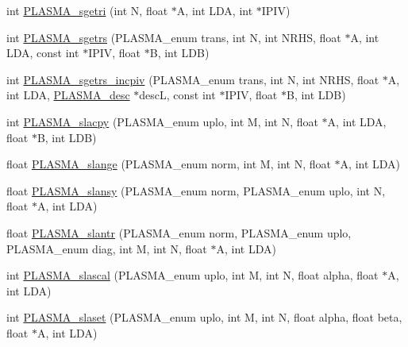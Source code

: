 \begin{DoxyCompactItemize}
int \hyperlink{group__float_gadb78715cdd99791aa77c2640f1325f8e_gadb78715cdd99791aa77c2640f1325f8e}{P\+L\+A\+S\+M\+A\+\_\+sgetri} (int N, float $\ast$A, int L\+D\+A, int $\ast$I\+P\+I\+V)
\item 
int \hyperlink{group__float_ga655cb742ac1c78e5ce86070f4ce1271b_ga655cb742ac1c78e5ce86070f4ce1271b}{P\+L\+A\+S\+M\+A\+\_\+sgetrs} (P\+L\+A\+S\+M\+A\+\_\+enum trans, int N, int N\+R\+H\+S, float $\ast$A, int L\+D\+A, const int $\ast$I\+P\+I\+V, float $\ast$B, int L\+D\+B)
\item 
int \hyperlink{group__float_gae593ed2d7e164acc75c4e6efdca4d95a_gae593ed2d7e164acc75c4e6efdca4d95a}{P\+L\+A\+S\+M\+A\+\_\+sgetrs\+\_\+incpiv} (P\+L\+A\+S\+M\+A\+\_\+enum trans, int N, int N\+R\+H\+S, float $\ast$A, int L\+D\+A, \hyperlink{structplasma__desc__t}{P\+L\+A\+S\+M\+A\+\_\+desc} $\ast$desc\+L, const int $\ast$I\+P\+I\+V, float $\ast$B, int L\+D\+B)
\item 
int \hyperlink{group__float_ga2ae5e8cc7cf6222bf521a6decd6c27a1_ga2ae5e8cc7cf6222bf521a6decd6c27a1}{P\+L\+A\+S\+M\+A\+\_\+slacpy} (P\+L\+A\+S\+M\+A\+\_\+enum uplo, int M, int N, float $\ast$A, int L\+D\+A, float $\ast$B, int L\+D\+B)
\item 
float \hyperlink{group__float_gaf12ff85306bc548593674ce694d5e5be_gaf12ff85306bc548593674ce694d5e5be}{P\+L\+A\+S\+M\+A\+\_\+slange} (P\+L\+A\+S\+M\+A\+\_\+enum norm, int M, int N, float $\ast$A, int L\+D\+A)
\item 
float \hyperlink{group__float_gaad7d8cac5c5334f8cc144f36050bbdc3_gaad7d8cac5c5334f8cc144f36050bbdc3}{P\+L\+A\+S\+M\+A\+\_\+slansy} (P\+L\+A\+S\+M\+A\+\_\+enum norm, P\+L\+A\+S\+M\+A\+\_\+enum uplo, int N, float $\ast$A, int L\+D\+A)
\item 
float \hyperlink{group__float_gac89a3f7eb1600d358791d38d2e662cb1_gac89a3f7eb1600d358791d38d2e662cb1}{P\+L\+A\+S\+M\+A\+\_\+slantr} (P\+L\+A\+S\+M\+A\+\_\+enum norm, P\+L\+A\+S\+M\+A\+\_\+enum uplo, P\+L\+A\+S\+M\+A\+\_\+enum diag, int M, int N, float $\ast$A, int L\+D\+A)
\item 
int \hyperlink{group__float_ga70bbb11d008076ce34d89399a31d5ca2_ga70bbb11d008076ce34d89399a31d5ca2}{P\+L\+A\+S\+M\+A\+\_\+slascal} (P\+L\+A\+S\+M\+A\+\_\+enum uplo, int M, int N, float alpha, float $\ast$A, int L\+D\+A)
\item 
int \hyperlink{group__float_gaeb7486c1cb46dd4a81c11981605c093c_gaeb7486c1cb46dd4a81c11981605c093c}{P\+L\+A\+S\+M\+A\+\_\+slaset} (P\+L\+A\+S\+M\+A\+\_\+enum uplo, int M, int N, float alpha, float beta, float $\ast$A, int L\+D\+A)
\item 

\end{DoxyCompactItemize}
